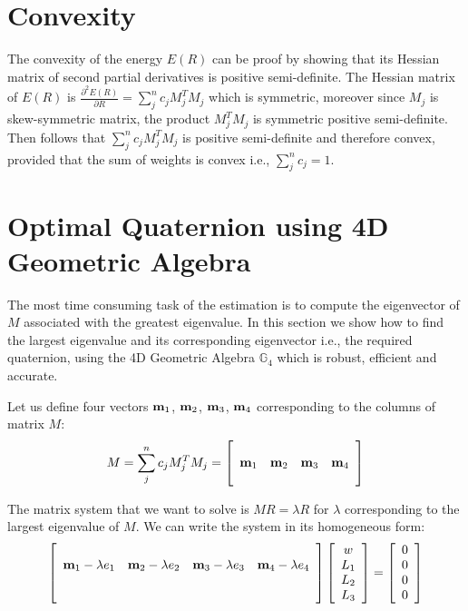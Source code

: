 \documentclass{birkjour}
\numberwithin{equation}{section}
\begin{document}
\section{Convexity}

The convexity of the energy $E(R)$ can be proof by showing that its Hessian matrix of second partial derivatives is positive semi-definite. The Hessian matrix of $E(R)$ is $\frac{\partial^2 E(R)}{\partial R} = \sum_j^n { c_j M_j^T M_j}$ which is symmetric, moreover since $M_j$ is skew-symmetric matrix, the product $M_j^T M_j$ is symmetric positive semi-definite. Then follows that $\sum_j^n { c_j M_j^T M_j}$ is positive semi-definite and therefore convex, provided that the sum of weights is convex i.e., $\sum_j^n { c_j } = 1$.

\section{Optimal Quaternion using 4D Geometric Algebra}

The most time consuming task of the estimation is to compute the eigenvector of $M$ associated with the greatest eigenvalue. In this section we show how to find the largest eigenvalue and its corresponding eigenvector i.e., the required quaternion, using the 4D Geometric Algebra $ \mathbb{G}_4$ which is robust, efficient and accurate.

Let us define four vectors $\textbf m_1$, $\textbf m_2$, $\textbf m_3$, $\textbf m_4$ corresponding to the columns of matrix $M$:
\begin{eqnarray}
	M = \sum_j^n { c_j M_j^T M_j} =
	\left[\begin{array}{cccc}
		\\
		\textbf m_1 & \textbf m_2 & \textbf m_3 & \textbf m_4 \\
		\\
	\end{array}\right]
\end{eqnarray}

The matrix system that we want to solve is $M R = \lambda R$ for $\lambda$ corresponding to the largest eigenvalue of $M$. We can write the system in its homogeneous form:
\begin{eqnarray}
	\label{eqn:eigensystem}
	\left[\begin{array}{cccc}
		\\
		\textbf m_1 - \lambda e_1 & \textbf m_2 - \lambda e_2 & \textbf m_3 - \lambda e_3 & \textbf m_4- \lambda e_4 \\
		\\
		\\
	\end{array}\right]
	\left[\begin{array}{c} 
		w \\
		L_1\\
		L_2\\
		L_3
	\end{array}\right] = 	
	\left[\begin{array}{c} 
		0 \\
		0 \\
		0 \\
		0
	\end{array}\right]
\end{eqnarray}
\end{document}

